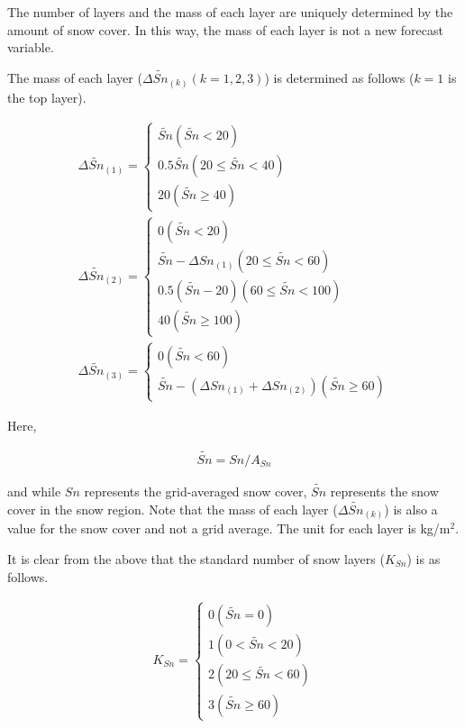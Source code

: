 The number of layers and the mass of each layer are uniquely determined
by the amount of snow cover. In this way, the mass of each layer is not
a new forecast variable.

The mass of each layer (\(\Delta \widetilde{Sn}_{(k)} (k=1,2,3)\)) is
determined as follows (\(k=1\) is the top layer).

\begin{eqnarray}
 \Delta \widetilde{Sn}_{(1)} = \left\{
\begin{array}{ll}
 \widetilde{Sn}  (\widetilde{Sn} < 20) \\
 0.5\widetilde{Sn}  (20 \leq \widetilde{Sn} < 40)\\
 20  (\widetilde{Sn} \geq 40)
\end{array}
\right. \\
 \Delta \widetilde{Sn}_{(2)} = \left\{
\begin{array}{ll}
 0  (\widetilde{Sn} < 20) \\
 \widetilde{Sn} - \Delta Sn_{(1)}  (20 \leq \widetilde{Sn} < 60)\\
 0.5(\widetilde{Sn}-20)  (60 \leq \widetilde{Sn} < 100)\\
 40  (\widetilde{Sn} \geq 100)
\end{array}
\right. \\
 \Delta \widetilde{Sn}_{(3)} = \left\{
\begin{array}{ll}
 0  (\widetilde{Sn} < 60) \\
 \widetilde{Sn} - (\Delta Sn_{(1)} + \Delta Sn_{(2)}) (\widetilde{Sn} \geq 60)
\end{array}
\right. 
\end{eqnarray}

Here,

\begin{eqnarray}
 \widetilde{Sn} =  Sn / A_{Sn}
\end{eqnarray}

and while \(Sn\) represents the grid-averaged snow cover,
\(\widetilde{Sn}\) represents the snow cover in the snow region. Note
that the mass of each layer (\(\Delta \widetilde{Sn}_{(k)}\)) is also a
value for the snow cover and not a grid average. The unit for each layer
is kg/m\(^2\).

It is clear from the above that the standard number of snow layers
(\(K_{Sn}\)) is as follows.

\begin{eqnarray}
 K_{Sn} = \left\{
\begin{array}{ll}
 0  (\widetilde{Sn} = 0)\\
 1  (0< \widetilde{Sn} < 20)\\
 2  (20 \leq \widetilde{Sn} < 60)\\
 3  (\widetilde{Sn} \geq 60)
\end{array}
\right.
\end{eqnarray}

